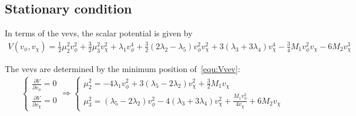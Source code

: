 \documentclass[12pt]{article}
\begin{document}
\subsection{Stationary condition}

In terms of the vevs, the scalar potential is given by
\begin{align}
\label{equ:Vvev}
V(v_\phi,v_\chi) = \frac{1}{2}\mu_2^2v_\phi^2+\frac{3}{2}\mu_3^2v_\chi^2 + \lambda_1 v_\phi^4 + \frac{3}{2}(2\lambda_2-\lambda_5)v_\phi^2v_\chi^2 + 3(\lambda_3 + 3\lambda_4)v_\chi^4 - \frac{3}{4}M_1v_\phi^2v_\chi - 6M_2v_\chi^3
\end{align}

The vevs are determined by the minimum position of~\autoref{equ:Vvev}:
\begin{align}
    \label{equ:stationary_condition}
    \begin{cases}
    \frac{\partial V}{\partial v_\phi} = 0 \\
    \frac{\partial V}{\partial v_\chi} = 0
    \end{cases} \Rightarrow \begin{cases}
    \mu_2^2 = -4\lambda_1v_\phi^2+3(\lambda_5-2\lambda_2)v_\chi^2 + \frac{3}{2}M_1v_\chi\\
    \mu_3^2 = (\lambda_5-2\lambda_2)v_\phi^2-4(\lambda_3+3\lambda_4)v_\chi^2+\frac{M_1v_\phi^2}{4v_\chi}+6M_2v_\chi
    \end{cases}
\end{align}
\end{document}
